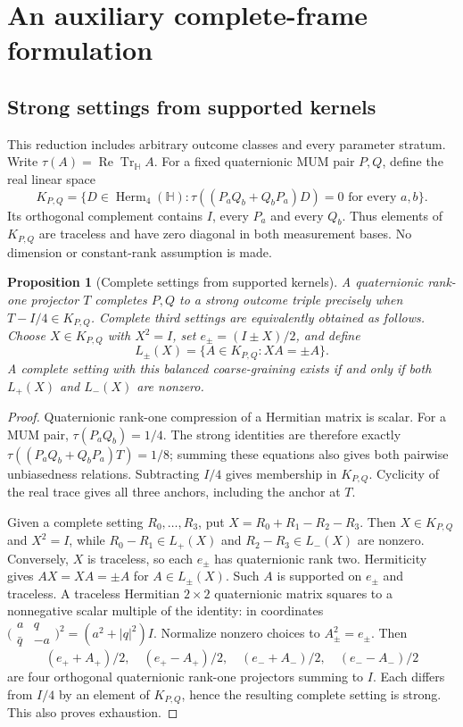 \documentclass[11pt]{article}
\newtheorem{proposition}[theorem]{Proposition}
\begin{document}
\section{An auxiliary complete-frame formulation}\label{app:noncommuting}
\subsection{Strong settings from supported kernels}
\label{sec:globalcoarse}
This reduction includes arbitrary outcome classes and every parameter
stratum. Write $\tau(A)=\operatorname{Re}\operatorname{Tr}_{\mathbb H}A$.
For a fixed quaternionic MUM pair $P,Q$, define the real linear space
\[
 K_{P,Q}=\{D\in\operatorname{Herm}_4(\mathbb H):
 \tau((P_aQ_b+Q_bP_a)D)=0\text{ for every }a,b\}.
\]
Its orthogonal complement contains $I$, every $P_a$ and every $Q_b$.
Thus elements of $K_{P,Q}$ are traceless and have zero diagonal in
both measurement bases. No dimension or constant-rank assumption is made.

\begin{proposition}[Complete settings from supported kernels]
\label{prop:globalkernels}
A quaternionic rank-one projector $T$ completes $P,Q$ to a strong
outcome triple precisely when $T-I/4\in K_{P,Q}$.
Complete third settings are equivalently obtained as follows. Choose
$X\in K_{P,Q}$ with $X^2=I$, set $e_\pm=(I\pm X)/2$, and define
\[
 L_\pm(X)=\{A\in K_{P,Q}:XA=\pm A\}.
\]
A complete setting with this balanced coarse-graining exists if and only
if both $L_+(X)$ and $L_-(X)$ are nonzero.
\end{proposition}
\begin{proof}
Quaternionic rank-one compression of a Hermitian matrix is scalar.
For a MUM pair, $\tau(P_aQ_b)=1/4$. The strong identities are therefore
exactly $\tau((P_aQ_b+Q_bP_a)T)=1/8$; summing these equations also
gives both pairwise unbiasedness relations. Subtracting $I/4$ gives
membership in $K_{P,Q}$. Cyclicity of the real trace gives all three
anchors, including the anchor at $T$.

Given a complete setting $R_0,\ldots,R_3$, put
$X=R_0+R_1-R_2-R_3$. Then $X\in K_{P,Q}$ and $X^2=I$,
while $R_0-R_1\in L_+(X)$ and $R_2-R_3\in L_-(X)$ are nonzero.
Conversely, $X$ is traceless, so each $e_\pm$ has quaternionic rank two.
Hermiticity gives $AX=XA=\pm A$ for $A\in L_\pm(X)$.
Such $A$ is supported on $e_\pm$ and traceless. A traceless Hermitian
$2\times2$ quaternionic matrix squares to a nonnegative scalar multiple
of the identity: in coordinates
$\bigl(\begin{smallmatrix}a&q\\\bar q&-a\end{smallmatrix}\bigr)^2
=(a^2+|q|^2)I$. Normalize nonzero choices to
$A_\pm^2=e_\pm$. Then
\[
 (e_++A_+)/2,\quad(e_+-A_+)/2,\quad
 (e_-+A_-)/2,\quad(e_--A_-)/2
\]
are four orthogonal quaternionic rank-one projectors summing to $I$.
Each differs from $I/4$ by an element of $K_{P,Q}$, hence the resulting
complete setting is strong. This also proves exhaustion.
\end{proof}
\end{document}
